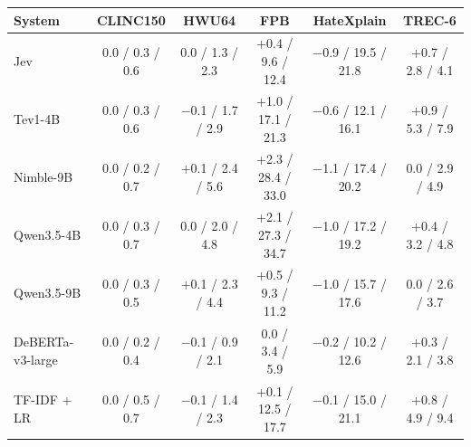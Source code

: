 \begin{tabular}{lccccc}
\toprule
System & CLINC150 & HWU64 & FPB & HateXplain & TREC-6 \\
\midrule
Jev & 0.0 / 0.3 / 0.6 & 0.0 / 1.3 / 2.3 & +0.4 / 9.6 / 12.4 & $-$0.9 / 19.5 / 21.8 & +0.7 / 2.8 / 4.1 \\
Tev1-4B & 0.0 / 0.3 / 0.6 & $-$0.1 / 1.7 / 2.9 & +1.0 / 17.1 / 21.3 & $-$0.6 / 12.1 / 16.1 & +0.9 / 5.3 / 7.9 \\
Nimble-9B & 0.0 / 0.2 / 0.7 & +0.1 / 2.4 / 5.6 & +2.3 / 28.4 / 33.0 & $-$1.1 / 17.4 / 20.2 & 0.0 / 2.9 / 4.9 \\
Qwen3.5-4B & 0.0 / 0.3 / 0.7 & 0.0 / 2.0 / 4.8 & +2.1 / 27.3 / 34.7 & $-$1.0 / 17.2 / 19.2 & +0.4 / 3.2 / 4.8 \\
Qwen3.5-9B & 0.0 / 0.3 / 0.5 & +0.1 / 2.3 / 4.4 & +0.5 / 9.3 / 11.2 & $-$1.0 / 15.7 / 17.6 & 0.0 / 2.6 / 3.7 \\
DeBERTa-v3-large & 0.0 / 0.2 / 0.4 & $-$0.1 / 0.9 / 2.1 & 0.0 / 3.4 / 5.9 & $-$0.2 / 10.2 / 12.6 & +0.3 / 2.1 / 3.8 \\
TF-IDF + LR & 0.0 / 0.5 / 0.7 & $-$0.1 / 1.4 / 2.3 & +0.1 / 12.5 / 17.7 & $-$0.1 / 15.0 / 21.1 & +0.8 / 4.9 / 9.4 \\
\bottomrule
\end{tabular}
